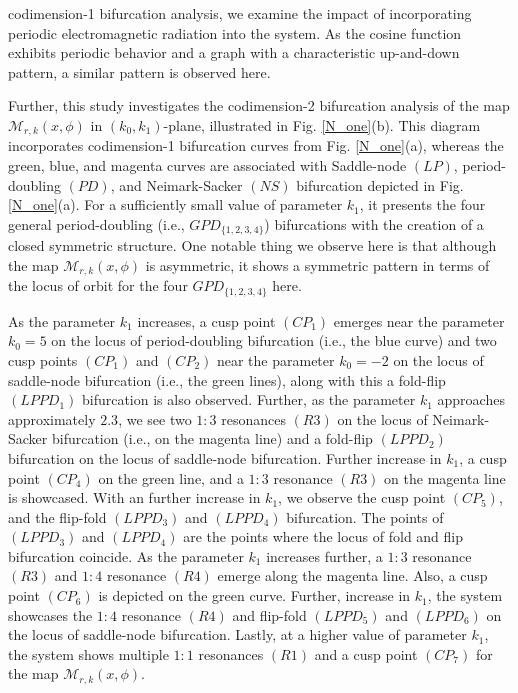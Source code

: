 \documentclass{article}
\begin{document}
codimension-1 bifurcation analysis, we examine the impact of incorporating periodic electromagnetic radiation into the system. As the cosine function exhibits periodic behavior and a graph with a characteristic up-and-down pattern, a similar pattern is observed here.

Further, this study investigates the codimension-2 bifurcation analysis of the map $\mathcal{M}_{r,k}(x,\phi)$ in $(k_0,k_1)$-plane, illustrated in Fig. \ref{N_one}(b). This diagram incorporates codimension-1 bifurcation curves from Fig. \ref{N_one}(a), whereas the green, blue, and magenta curves are associated with Saddle-node $(LP)$, period-doubling $(PD)$, and Neimark-Sacker $(NS)$ bifurcation depicted in Fig. \ref{N_one}(a). For a sufficiently small value of parameter $k_1$, it presents the four general period-doubling (i.e., $GPD_{\{1,2,3,4\}} $) bifurcations with the creation of a closed symmetric structure. One notable thing we observe here is that although the map $\mathcal{M}_{r,k}(x,\phi)$ is asymmetric, it shows a symmetric pattern in terms of the locus of orbit for the four $GPD_{\{1,2,3,4\}}$ here.

As the parameter $k_1$ increases, a cusp point $(CP_1)$ emerges near the parameter $k_0=5$ on the locus of period-doubling bifurcation (i.e., the blue curve) and two cusp points $(CP_1)$ and $(CP_2)$ near the parameter $k_0=-2$ on the locus of saddle-node bifurcation (i.e., the green lines), along with this a fold-flip $(LPPD_1)$ bifurcation is also observed. Further, as the parameter $k_1$ approaches approximately $2.3$, we see two $1:3$ resonances $(R3)$ on the locus of Neimark-Sacker bifurcation (i.e., on the magenta line) and a fold-flip $(LPPD_2)$ bifurcation on the locus of saddle-node bifurcation. Further increase in $ k_1$, a cusp point $(CP_4)$ on the green line, and a $1:3$ resonance $(R3)$ on the magenta line is showcased.  With an further increase in $k_1$, we observe the cusp point $(CP_5)$, and the flip-fold $(LPPD_3)$ and $(LPPD_4)$ bifurcation. The points of $(LPPD_3)$ and $(LPPD_4)$ are the points where the locus of fold and flip bifurcation coincide. As the parameter $k_1$ increases further, a $1:3$ resonance $(R3)$ and $1:4$ resonance $(R4)$ emerge along the magenta line.  Also, a cusp point $(CP_6)$ is depicted on the green curve. Further, increase in $k_1$, the system showcases the $1:4$ resonance $(R4)$ and flip-fold $(LPPD_5)$ and $(LPPD_6)$ on the locus of saddle-node bifurcation.  Lastly, at a higher value of parameter $k_1$, the system shows multiple $1:1$ resonances $(R1)$ and a cusp point $(CP_7)$ for the map $\mathcal{M}_{r,k}(x,\phi)$.
\end{document}
